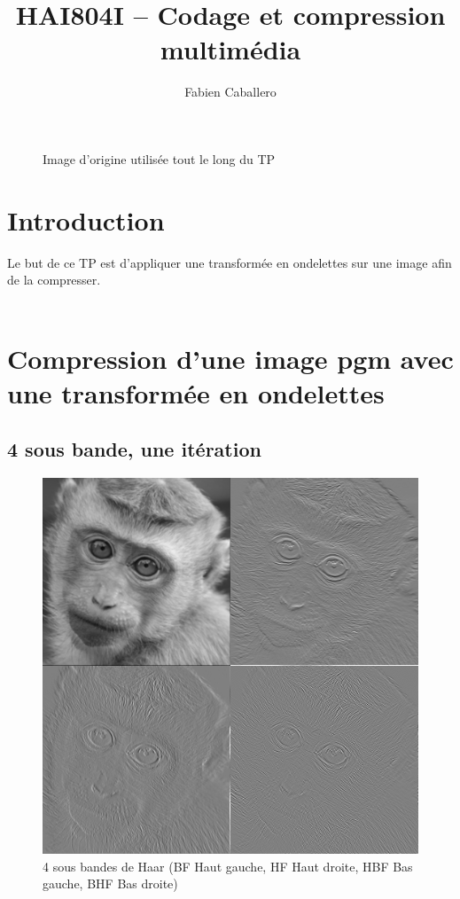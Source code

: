 \documentclass{article}
\title{HAI804I – Codage et compression multimédia
}
\author{Fabien Caballero}
\begin{document}
\maketitle
    \tableofcontents

\newpage

\begin{figure}[h]
\caption{Image d'origine utilisée tout le long du TP}
\end{figure}

\section*{Introduction}
Le but de ce TP est d’appliquer une transformée en ondelettes sur une image afin de la
compresser.
\\\\
\section{Compression d'une image pgm avec une transformée en ondelettes}
\subsection{4 sous bande, une itération}
\begin{figure}[h!]
\centerline{ \includegraphics[scale=0.5]{./rendus/4sousBandes1iterPGM.png} }
\caption{4 sous bandes de Haar (BF Haut gauche, HF Haut droite, HBF Bas gauche, BHF Bas droite)} 
\end{figure}
\end{document}
